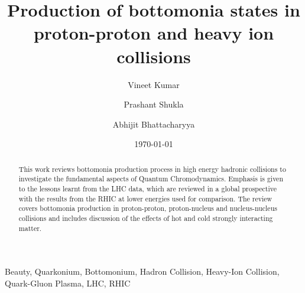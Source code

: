 \documentclass[review]{elsarticle}
\begin{document}
\fontsize{11}{15}
\selectfont

\begin{frontmatter}
  \title{Production of bottomonia states in proton-proton and heavy ion collisions}
  \author[NPD]{Vineet Kumar}
  \author[NPD,HBNI]{Prashant Shukla}
  \author[UOC]{Abhijit Bhattacharyya}
  \address[NPD]{Nuclear Physics Division, Bhabha Atomic Research Centre, Mumbai 400085, India}
  \address[HBNI]{Homi Bhabha National Institute, Anushakti Nagar, Mumbai 400094, India}
  \address[UOC]{Department of Physics, University of Calcutta, 92, A. P. C. Road Kolkata-700009, India}
  \date{\today}
  
  \begin{abstract}
    
    This work reviews bottomonia production process in high energy hadronic collisions to investigate
    the fundamental aspects of Quantum Chromodynamics. Emphasis is given to the lessons learnt from the LHC
    data, which are reviewed in a global prospective with the results from the RHIC at lower energies used
    for comparison. The review covers bottomonia production in proton-proton, proton-nucleus and nucleus-nucleus
    collisions and includes discussion of the effects of hot and cold strongly interacting matter.

  \end{abstract}
  
  \begin{keyword}
    Beauty, Quarkonium, Bottomonium, Hadron Collision, Heavy-Ion Collision, Quark-Gluon Plasma, LHC, RHIC
  \end{keyword}
  


  

\maketitle

\tableofcontents


\end{frontmatter}









\end{document}

